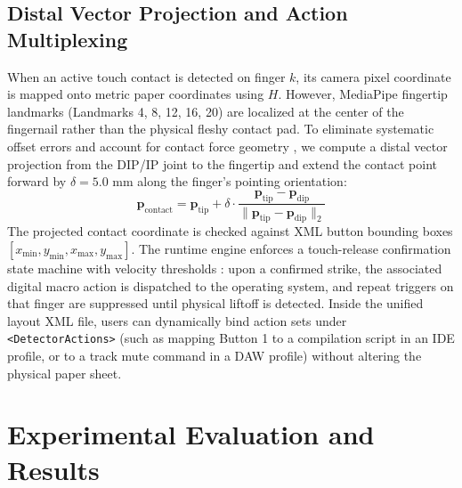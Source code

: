 \documentclass[conference]{IEEEtran}
\begin{document}
\subsection{Distal Vector Projection and Action Multiplexing}
When an active touch contact is detected on finger $k$, its camera pixel coordinate is mapped onto metric paper coordinates using $H$. However, MediaPipe fingertip landmarks (Landmarks 4, 8, 12, 16, 20) are localized at the center of the fingernail rather than the physical fleshy contact pad. To eliminate systematic offset errors and account for contact force geometry \cite{Sun2009Estimation}, we compute a distal vector projection from the DIP/IP joint to the fingertip and extend the contact point forward by $\delta = 5.0\text{ mm}$ along the finger's pointing orientation:
\begin{equation}
\mathbf{p}_{\text{contact}} = \mathbf{p}_{\text{tip}} + \delta \cdot \frac{\mathbf{p}_{\text{tip}} - \mathbf{p}_{\text{dip}}}{\|\mathbf{p}_{\text{tip}} - \mathbf{p}_{\text{dip}}\|_2}
\label{eq:distal_projection}
\end{equation}
The projected contact coordinate is checked against XML button bounding boxes $[x_{\min}, y_{\min}, x_{\max}, y_{\max}]$. The runtime engine enforces a touch-release confirmation state machine with velocity thresholds \cite{Kumar2026Hybrid}: upon a confirmed strike, the associated digital macro action is dispatched to the operating system, and repeat triggers on that finger are suppressed until physical liftoff is detected. Inside the unified layout XML file, users can dynamically bind action sets under \texttt{<DetectorActions>} (such as mapping Button 1 to a compilation script in an IDE profile, or to a track mute command in a DAW profile) without altering the physical paper sheet.

\section{Experimental Evaluation and Results}
\label{sec:results}
\end{document}
